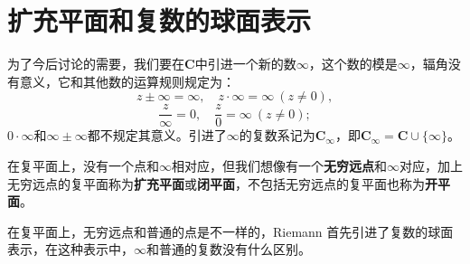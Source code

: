 \documentclass[../../main.tex]{subfiles}
\begin{document}
\section{扩充平面和复数的球面表示}

\begin{definition}
为了今后讨论的需要，我们要在\(\mathbf{C}\)中引进一个新的数\(\infty\)，这个数的模是\(\infty\)，辐角没有意义，它和其他数的运算规则规定为：
\[
z \pm \infty = \infty, \quad z \cdot \infty = \infty \ (z \neq 0),
\]
\[
\frac{z}{\infty} = 0, \quad \frac{z}{0} = \infty \ (z \neq 0);
\]
\(0 \cdot \infty\)和\(\infty \pm \infty\)都不规定其意义。引进了\(\infty\)的复数系记为\(\mathbf{C}_\infty\)，即\(\mathbf{C}_\infty = \mathbf{C} \cup \{ \infty \}\)。

在复平面上，没有一个点和\(\infty\)相对应，但我们想像有一个\textbf{无穷远点}和\(\infty\)对应，加上无穷远点的复平面称为\textbf{扩充平面}或\textbf{闭平面}，不包括无穷远点的复平面也称为\textbf{开平面}。
\end{definition}
\begin{remark}
在复平面上，无穷远点和普通的点是不一样的，Riemann 首先引进了复数的球面表示，在这种表示中，\(\infty\)和普通的复数没有什么区别。
\end{remark}
\end{document}
